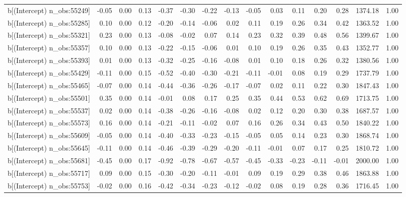 \begin{table}[ht]
\begin{tabular}{rrrrrrrrrrrrrrr}
  b[(Intercept) n\_obs:55249] & -0.05 & 0.00 & 0.13 & -0.37 & -0.30 & -0.22 & -0.13 & -0.05 & 0.03 & 0.11 & 0.20 & 0.28 & 1374.18 & 1.00 \\ 
  b[(Intercept) n\_obs:55285] & 0.10 & 0.00 & 0.12 & -0.20 & -0.14 & -0.06 & 0.02 & 0.11 & 0.19 & 0.26 & 0.34 & 0.42 & 1363.52 & 1.00 \\ 
  b[(Intercept) n\_obs:55321] & 0.23 & 0.00 & 0.13 & -0.08 & -0.02 & 0.07 & 0.14 & 0.23 & 0.32 & 0.39 & 0.48 & 0.56 & 1399.67 & 1.00 \\ 
  b[(Intercept) n\_obs:55357] & 0.10 & 0.00 & 0.13 & -0.22 & -0.15 & -0.06 & 0.01 & 0.10 & 0.19 & 0.26 & 0.35 & 0.43 & 1352.77 & 1.00 \\ 
  b[(Intercept) n\_obs:55393] & 0.01 & 0.00 & 0.13 & -0.32 & -0.25 & -0.16 & -0.08 & 0.01 & 0.10 & 0.18 & 0.26 & 0.32 & 1380.56 & 1.00 \\ 
  b[(Intercept) n\_obs:55429] & -0.11 & 0.00 & 0.15 & -0.52 & -0.40 & -0.30 & -0.21 & -0.11 & -0.01 & 0.08 & 0.19 & 0.29 & 1737.79 & 1.00 \\ 
  b[(Intercept) n\_obs:55465] & -0.07 & 0.00 & 0.14 & -0.44 & -0.36 & -0.26 & -0.17 & -0.07 & 0.02 & 0.11 & 0.22 & 0.30 & 1847.43 & 1.00 \\ 
  b[(Intercept) n\_obs:55501] & 0.35 & 0.00 & 0.14 & -0.01 & 0.08 & 0.17 & 0.25 & 0.35 & 0.44 & 0.53 & 0.62 & 0.69 & 1713.75 & 1.00 \\ 
  b[(Intercept) n\_obs:55537] & 0.02 & 0.00 & 0.14 & -0.38 & -0.26 & -0.16 & -0.08 & 0.02 & 0.12 & 0.20 & 0.30 & 0.38 & 1687.57 & 1.00 \\ 
  b[(Intercept) n\_obs:55573] & 0.16 & 0.00 & 0.14 & -0.21 & -0.11 & -0.02 & 0.07 & 0.16 & 0.26 & 0.34 & 0.43 & 0.50 & 1840.22 & 1.00 \\ 
  b[(Intercept) n\_obs:55609] & -0.05 & 0.00 & 0.14 & -0.40 & -0.33 & -0.23 & -0.15 & -0.05 & 0.05 & 0.14 & 0.23 & 0.30 & 1868.74 & 1.00 \\ 
  b[(Intercept) n\_obs:55645] & -0.11 & 0.00 & 0.14 & -0.46 & -0.39 & -0.29 & -0.20 & -0.11 & -0.01 & 0.07 & 0.17 & 0.25 & 1810.72 & 1.00 \\ 
  b[(Intercept) n\_obs:55681] & -0.45 & 0.00 & 0.17 & -0.92 & -0.78 & -0.67 & -0.57 & -0.45 & -0.33 & -0.23 & -0.11 & -0.01 & 2000.00 & 1.00 \\ 
  b[(Intercept) n\_obs:55717] & 0.09 & 0.00 & 0.15 & -0.30 & -0.20 & -0.11 & -0.01 & 0.09 & 0.19 & 0.29 & 0.38 & 0.46 & 1863.88 & 1.00 \\ 
  b[(Intercept) n\_obs:55753] & -0.02 & 0.00 & 0.16 & -0.42 & -0.34 & -0.23 & -0.12 & -0.02 & 0.08 & 0.19 & 0.28 & 0.36 & 1716.45 & 1.00 \\ 

\end{tabular}
\end{table}
